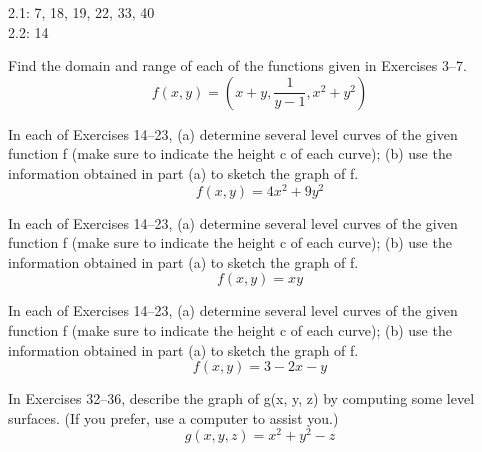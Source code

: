 \documentclass[11pt,letterpaper,boxed]{pset}
\begin{document}
    \begin{center}
        2.1: 7, 18, 19, 22, 33, 40 \\
        2.2: 14
    \end{center}
    
    
    \begin{problem}[2.1 \#7]
    Find the domain and range of each of the functions given in Exercises 3–7.
    \[f(x,y)=(x+y, \frac{1}{y-1}, x^2+y^2)\]
    \end{problem}
    \newpage
    
    
    \begin{problem}[2.1 \#18]
    In each of Exercises 14–23, (a) determine several level curves of the given function f (make sure to indicate the height c of each curve); (b) use the information obtained in part (a) to sketch the graph of f.
    \[f(x,y)=4x^2+9y^2\]
    \end{problem}
    \newpage
    
    
    \begin{problem}[2.1 \#19]
    In each of Exercises 14–23, (a) determine several level curves of the given function f (make sure to indicate the height c of each curve); (b) use the information obtained in part (a) to sketch the graph of f.
    \[f(x,y)=xy\]
    \end{problem}
    \newpage
    
    
    \begin{problem}[2.1 \#22]
    In each of Exercises 14–23, (a) determine several level curves of the given function f (make sure to indicate the height c of each curve); (b) use the information obtained in part (a) to sketch the graph of f.
    \[f(x,y)=3−2x−y\]
    \end{problem}
    \newpage
    
    
    \begin{problem}[2.1 \#33]
    In Exercises 32–36, describe the graph of g(x, y, z) by computing some level surfaces. (If you prefer, use a computer to assist you.)
    \[g(x,y,z)=x^2+y^2-z\]
    \end{problem}
    \newpage
    
\end{document}
